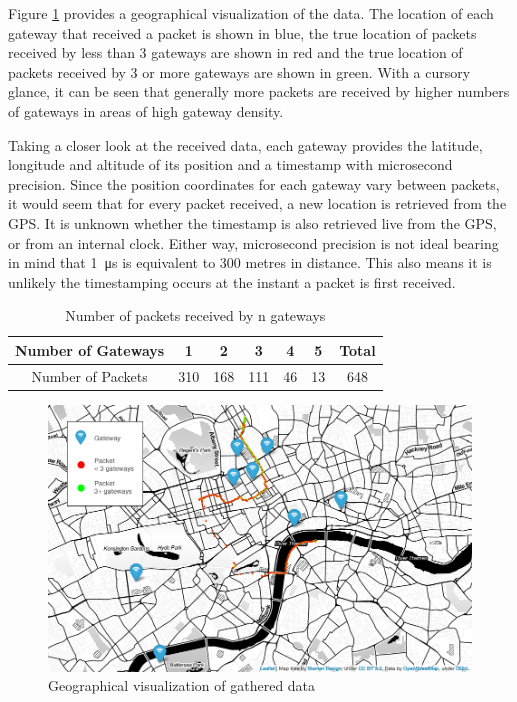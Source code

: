 \documentclass[a4paper]{report}
\begin{document}
    Figure \ref{fig:datamap} provides a geographical visualization of the data. The location of each gateway that received a packet is shown in blue, the true location of packets received by less than 3 gateways are shown in red and the true location of packets received by 3 or more gateways are shown in green. With a cursory glance, it can be seen that generally more packets are received by higher numbers of gateways in areas of high gateway density.

    Taking a closer look at the received data, each gateway provides the latitude, longitude and altitude of its position and a timestamp with microsecond precision. Since the position coordinates for each gateway vary between packets, it would seem that for every packet received, a new location is retrieved from the GPS. It is unknown whether the timestamp is also retrieved live from the GPS, or from an internal clock. Either way, microsecond precision is not ideal bearing in mind that \SI{1}{\micro\second} is equivalent to 300 metres in distance. This also means it is unlikely the timestamping occurs at the instant a packet is first received.

    \begin{table}[ht]
      \begin{center}
        \caption{Number of packets received by n gateways}
        \label{tab:gatewaynums}
        \begin{tabular}{|c|c|c|c|c|c|c|}
          \hline
          Number of Gateways & 1 & 2 & 3 & 4 & 5 & Total \\
          \hline
          Number of Packets & 310 & 168 & 111 & 46 & 13 & 648 \\
          \hline
        \end{tabular}
      \end{center}
    \end{table}

    \begin{figure}[ht]
    \centering
    \includegraphics[width=15cm]{figures/map_data.png}
    \caption{Geographical visualization of gathered data}
    \label{fig:datamap}
    \end{figure}
\end{document}
